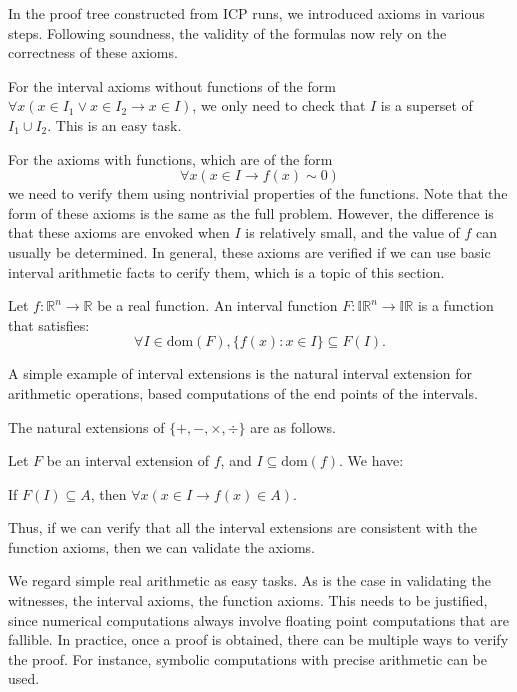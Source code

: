 \documentclass[envcountsect]{llncs}
\newcommand{\dom}{\mathrm{dom}}
\begin{document}
In the proof tree constructed from ICP runs, we introduced axioms in various
steps. Following soundness, the validity of the formulas now rely on the
correctness of these axioms. 

For the interval axioms without functions of the form $\forall x(x\in I_1\vee
x\in I_2\rightarrow x\in I)$, we only need to check that $I$ is a superset of
$I_1\cup I_2$. This is an easy task. 

For the axioms with functions, which are of the form 
$$\forall x (x\in I \rightarrow f(x)\sim 0)$$
we need to verify them using nontrivial properties of the functions. Note that
the form of these axioms is the same as the full problem. However, the
difference is that these axioms are envoked when $I$ is relatively small, and
the value of $f$ can usually be determined. In general, these axioms are
verified if we can use basic interval arithmetic facts to cerify them, which is
a topic of this section. 

\begin{definition}
Let $f: \mathbb{R}^n\rightarrow \mathbb{R}$ be a real function. An interval
function $F: \mathbb{IR}^n \rightarrow \mathbb{IR}$ is a function that
satisfies: 
$$\forall I\in \dom(F), \{f(x): x\in I\}\subseteq F(I).$$
\end{definition}

A simple example of interval extensions is the natural interval extension for
arithmetic operations, based computations of the end points of the intervals. 
\begin{example}
The natural extensions of $\{+, -, \times, \div\}$ are as follows. 
\end{example}

\begin{proposition}
Let $F$ be an interval extension of $f$, and $I\subseteq \dom(f)$. We have:
\begin{center}
If $F(I)\subseteq A$, then $\forall x (x\in I \rightarrow f(x)\in A)$. 
\end{center}
\end{proposition}
Thus, if we can verify that all the interval extensions are consistent with the
function axioms, then we can validate the axioms. 

\begin{remark}
We regard simple real arithmetic as easy tasks. 
As is the case in validating the witnesses, the interval axioms, the function
axioms. This needs to be justified, since numerical computations always involve
floating point computations that are fallible. In practice, once a proof is
obtained, there can be multiple ways to verify the proof. For instance, symbolic
computations with precise arithmetic can be used.  
\end{remark}
\end{document}

